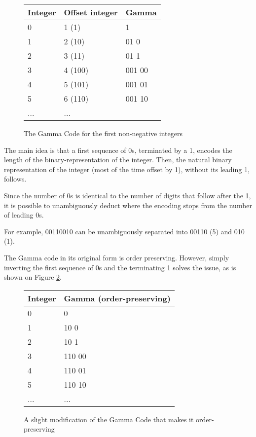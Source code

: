 \documentclass{acm_proc_article-sp}
\begin{document}
\begin{figure}
\caption{The Gamma Code for the first non-negative integers}
\label{figure-gamma-encoding}
\center
\begin{tabular}{|l|l|l|}
\hline
Integer & Offset integer & Gamma \\
\hline
0 & 1 (1) & 1 \\
\hline
1 & 2 (10) & 01 0  \\
\hline
2 & 3 (11) & 01 1  \\
\hline
3 & 4 (100) & 001 00 \\
\hline
4 & 5 (101) & 001 01 \\
\hline
5 & 6 (110) & 001 10 \\
\hline
... & ... \\
\hline
\end{tabular}
\end{figure}

 The main idea is that a first sequence of 0s, terminated by a 1, encodes the length of the binary-representation of the integer. Then, the natural binary representation of the integer (most of the time offset by 1), without its leading 1, follows.

Since the number of 0s is identical to the number of digits that follow after the 1, it is possible to unambiguously deduct where the encoding stops from the number of leading 0s.

For example, 00110010 can be unambiguously separated into 00110 (5) and 010 (1).

The Gamma code in its original form is order preserving. However, simply inverting the first sequence of 0s and the terminating 1 solves the issue, as is shown on Figure \ref{figure-gamma-encoding-tweaked}.

\begin{figure}
\caption{A slight modification of the Gamma Code that makes it order-preserving}
\label{figure-gamma-encoding-tweaked}
\center
\begin{tabular}{|l|l|}
\hline
Integer & Gamma (order-preserving) \\
\hline
0 & 0 \\
\hline
1 & 10 0  \\
\hline
2 & 10 1  \\
\hline
3 & 110 00 \\
\hline
4 & 110 01 \\
\hline
5 & 110 10 \\
\hline
... & ... \\
\hline
\end{tabular}
\end{figure}
\end{document}
